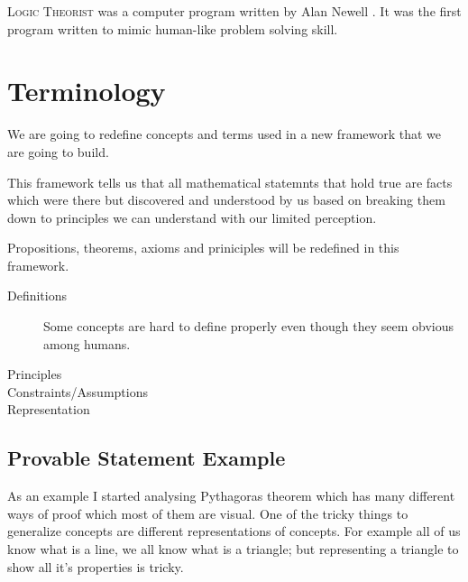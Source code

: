 \documentclass{article}
\begin{document}
\textsc{Logic Theorist} was a computer program written by Alan Newell . It was the first program written to mimic human-like problem solving skill. 



\section{Terminology}

We are going to redefine concepts and terms used in a new framework that we are going to build.

This framework tells us that all mathematical statemnts that hold true are facts which were there but discovered and understood by us based on breaking them down to principles we can understand with our limited perception.

Propositions, theorems, axioms and priniciples will be redefined in this framework.

\begin{description}
\item[Definitions]
Some concepts are hard to define properly even though they seem obvious among humans. 
\item[Principles]
 
\item[Constraints/Assumptions]

\item[Representation]


\end{description} 
 


\subsection*{Provable Statement Example}

As an example I started analysing Pythagoras theorem which has many different ways of proof which most of them are visual. One of the tricky things to generalize concepts are different representations of concepts. For example all of us know what is a line, we all know what is a triangle; but representing a triangle to show all it's properties is tricky.




\end{document}
